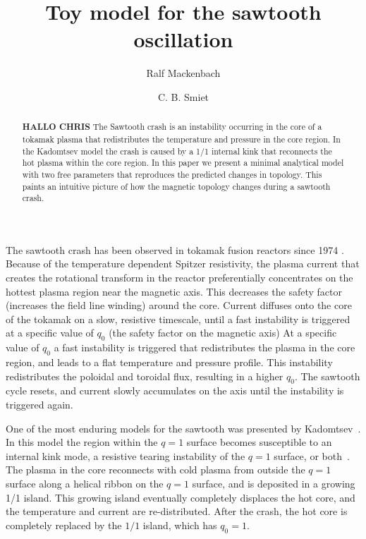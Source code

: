 \documentclass[%
superscriptaddress,
amsmath,amssymb,
aps,
pre,
floatfix,
]{revtex4-2}
\begin{document}
\title{Toy model for the sawtooth oscillation}
\author{Ralf Mackenbach}
\author{C. B. Smiet}

\begin{abstract}
\textbf{HALLO CHRIS}
  The Sawtooth crash is an instability occurring in the core of a tokamak plasma that redistributes the temperature and pressure in the core region.
  In the Kadomtsev model the crash is caused by a 1/1 internal kink that reconnects the hot plasma within the core region.
  In this paper we present a minimal analytical model with two free parameters that reproduces the predicted changes in topology.
  This paints an intuitive picture of how the magnetic topology changes during a sawtooth crash.
\end{abstract}
\maketitle

The sawtooth crash has been observed in tokamak fusion reactors since 1974 \cite{von1974studies, vershkov1974role}.
Because of the temperature dependent Spitzer resistivity, the plasma current that creates the rotational transform in the reactor preferentially concentrates on the hottest plasma region near the magnetic axis.
This decreases the safety factor (increases the field line winding) around the core.
Current diffuses onto the core of the tokamak on a slow, resistive timescale, until a fast instability is triggered at a specific value of $q_0$ (the safety factor on the magnetic axis)
At a specific value of $q_0$ a fast instability is triggered that redistributes the plasma in the core region, and leads to a flat temperature and pressure profile.
This instability redistributes the poloidal and toroidal flux, resulting in a higher $q_0$.
The sawtooth cycle resets, and current slowly accumulates on the axis until the instability is triggered again.

One of the most enduring models for the sawtooth was presented by Kadomtsev~\cite{kadomtsev1975disruptive}.
In this model the region within the $q=1$ surface becomes susceptible to an internal kink mode, a resistive tearing instability of the $q=1$ surface, or both~\cite{coppi1976resistive}.
The plasma in the core reconnects with cold plasma from outside the $q=1$ surface along a helical ribbon on the $q=1$ surface, and is deposited in a growing 1/1 island.
This growing island eventually completely displaces the hot core, and the temperature and current are re-distributed.
After the crash, the hot core is completely replaced by the $1/1$ island, which has $q_0=1$.
\end{document}
